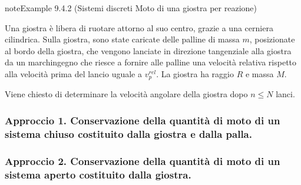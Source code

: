 \documentclass[letterpaper,10pt,italian]{jupyterBook}
\begin{document}
\begin{sphinxadmonition}{note}{Example 9.4.2 (Sistemi discreti \sphinxhyphen{} Moto di una giostra per reazione)}





\sphinxAtStartPar
Una giostra è libera di ruotare attorno al suo centro, grazie a una cerniera cilindrica. Sulla giostra, sono state caricate delle palline di massa \(m\), posizionate al bordo della giostra, che vengono lanciate in direzione tangenziale alla giostra da un marchingegno che riesce a fornire alle palline una velocità relativa rispetto alla velocità prima del lancio uguale a \(v_p^{rel}\). La giostra ha raggio \(R\) e massa \(M\).



\sphinxAtStartPar
Viene chiesto di determinare la velocità angolare della giostra dopo \(n \le N\) lanci.  

\sphinxAtStartPar
{}  
\subsubsection*{Approccio 1. Conservazione della quantità di moto di un sistema chiuso costituito dalla giostra e dalla palla.}
\subsubsection*{Approccio 2. Conservazione della quantità di moto di un sistema aperto costituito dalla giostra.}


\end{sphinxadmonition}
\end{document}
